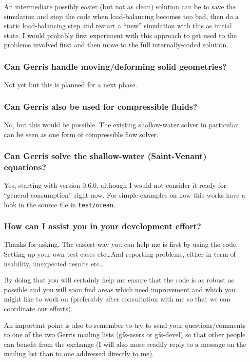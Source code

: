 \documentclass[a4paper]{article}
\begin{document}
An intermediate possibly easier (but not as clean) solution can be to
save the simulation and stop the code when load-balancing becomes too
bad, then do a static load-balancing step and restart a ``new''
simulation with this as initial state. I would probably first
experiment with this approach to get used to the problems involved
first and then move to the full internally-coded solution.

\subsubsection{Can Gerris handle moving/deforming solid geometries?}

Not yet but this is planned for a next phase.

\subsubsection{Can Gerris also be used for compressible fluids?}

No, but this would be possible. The existing shallow-water solver in particular
can be seen as one form of compressible flow solver.

\subsubsection{Can Gerris solve the shallow-water (Saint-Venant) equations?}

Yes, starting with version 0.6.0, although I would not consider it
ready for ``general consumption'' right now. For simple examples on how
this works have a look in the source file in {\tt test/ocean}.

\subsubsection{How can I assist you in your development effort?}

Thanks for asking. The easiest way you can help me is first by using
the code. Setting up your own test cases etc\dots And reporting
problems, either in term of usability, unexpected results etc\dots

By doing that you will certainly help me ensure that the code is as
robust as possible and you will soon find areas which need improvement
and which you might like to work on (preferably after consultation with
me so that we can coordinate our efforts).

An important point is also to remember to try to send your
questions/comments to one of the two Gerris mailing lists (gfs-users
or gfs-devel) so that other people can benefit from the exchange (I
will also more readily reply to a message on the mailing list than to
one addressed directly to me).
\end{document}
